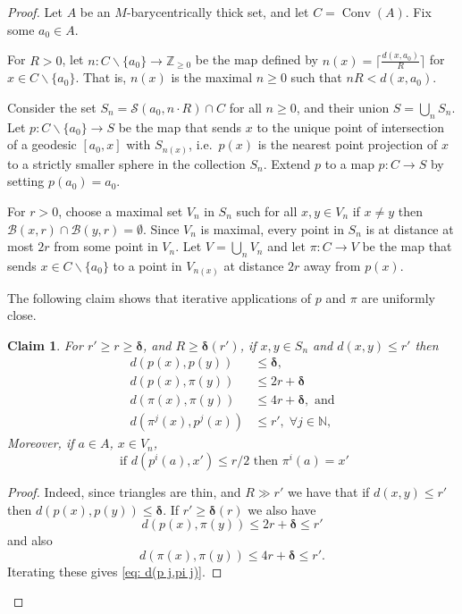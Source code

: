 \documentclass{amsart}
\numberwithin{equation}{section}
\newtheorem{claim}[theorem]{Claim}
\theoremstyle{definition}
\newcommand{\bbN}{\mathbb{N}}
\newcommand{\bbZ}{\mathbb{Z}}
\newcommand{\calB}{\mathcal{B}}
\newcommand{\calS}{\mathcal{S}}
\newcommand{\bdelta}{{\boldsymbol\delta}}
\newcommand{\ssm}{\smallsetminus}
\DeclareMathOperator{\conv}{Conv}
\begin{document}
    
\begin{proof}
    Let $A$ be an $M$-barycentrically thick set, and let $C = \conv(A)$.
    Fix some $a_0\in A$.
    
    For $R> 0$, let $n:C\ssm\{a_0\} \to \bbZ_{\ge 0}$ be the map defined by $n(x) = \lceil\tfrac{d(x,a_0)}{R}\rceil$ for $x\in C\ssm \{a_0\}$. That is, $n(x)$ is the maximal $n\ge 0$ such that $nR < d(x,a_0)$.

    Consider the set $S_n = \calS(a_0,n\cdot R)\cap C$ for all $n\ge 0$, and their union $S = \bigcup_n S_n$. Let $p:C\ssm\{a_0\}\to S$ be the map that sends $x$ to the unique point of intersection of a geodesic $[a_0,x]$ with $S_{n(x)}$,  i.e.\ $p(x)$ is the nearest point projection of $x$ to a strictly smaller sphere in the collection $S_n$.
    Extend $p$ to a map $p:C\to S$ by setting $p(a_0)=a_0$.

    For $r> 0$, choose a maximal set $V_n$ in $S_n$ such for all $x, y\in V_n$ if $x\ne y$ then $\calB(x,r)\cap \calB(y,r)=\emptyset$.
    Since $V_n$ is maximal, every point in $S_n$ is at distance at most $2r$ from some point in $V_n$.
    Let $V = \bigcup_n V_n$ and let $\pi:C  \to V$ be the map that sends $x\in C\ssm \{a_0\}$ to a point in $V_{n(x)}$ at distance $2r$ away from $p(x)$.

    The following claim shows that iterative applications of $p$ and $\pi$ are uniformly close.

    \begin{claim}\label{claim: distance inequality p pi}
        For $r'\ge r\ge \bdelta$, and $R\ge \bdelta(r')$, if $x,y\in S_n$ and $d(x,y)\le r'$ then 
        \begin{align}
            \label{eq: d(p,p)}d(p(x),p(y)) &\le \bdelta,\\
            \label{eq: d(p,pi)}d(p(x),\pi(y))&\le 2r+\bdelta\\ 
            \label{eq: d(pi,pi)}d(\pi(x),\pi(y))&\le 4r+\bdelta, \text{ and}\\
            \label{eq: d(p j,pi j)} d(\pi^j(x),p^j(x))&\le r',\;  \forall j\in \bbN,
        \end{align}
        Moreover, if $a\in A$, $x\in V_n$,
        \begin{equation}\label{eq: close p implies equal pi}
        \text{ if }d(p^i(a),x')\le r/2 \text{ then } \pi^i(a)=x'
        \end{equation}
    \end{claim}
    \begin{proof} 
        Indeed, since triangles are thin, and $R\gg r'$ we have that if $d(x,y)\le r'$ then $d(p(x),p(y))\le \bdelta$. If $r' \ge \bdelta(r)$ we also have $$d(p(x),\pi(y))\le 2r+\bdelta \le r'$$
        and also 
        \begin{equation*}
            d(\pi(x),\pi(y))\le 4r+\bdelta\le r'. 
        \end{equation*}
        Iterating these gives \eqref{eq: d(p j,pi j)}.
        

\end{proof}
\end{proof}
\end{document}
